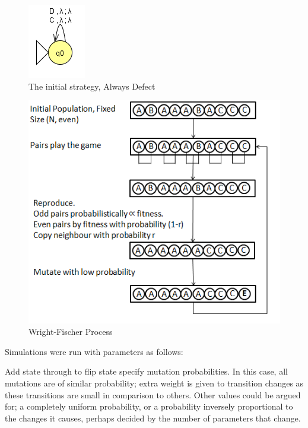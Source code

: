 \documentclass[a4paper,11pt,bcshonoursthesis,singlespace,twoside,thesisdraft,pdflatex]{cssethesis}
\begin{document}
\begin{figure}[h]
\centering
\includegraphics{alwaysDefect}
\caption{The initial strategy, Always Defect}
\label{fig:alld}
\end{figure}
\begin{figure}[h]
\centering
\includegraphics{wrightfischer}
\caption{Wright-Fischer Process}
\label{fig:wright}
\end{figure}
\pagebreak
Simulations were run with parameters as follows:

Add state through to flip state specify mutation probabilities. 
In this case, all mutations are of similar probability; extra weight is given to transition changes as these transitions are small in comparison to others. 
Other values could be argued for; a completely uniform probability, or a probability inversely proportional to the changes it causes, perhaps decided by the number of parameters that change. 
\end{document}
